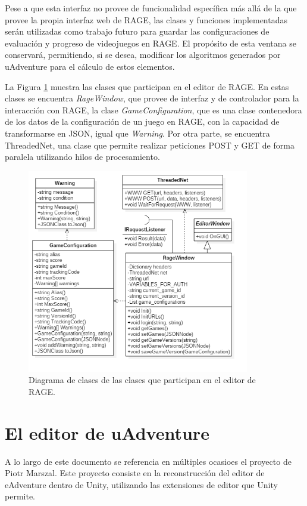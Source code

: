 Pese a que esta interfaz no provee de funcionalidad específica más allá de la que provee la propia interfaz web de RAGE, las clases y funciones implementadas serán utilizadas como trabajo futuro para guardar las configuraciones de evaluación y progreso de videojuegos en RAGE. El propósito de esta ventana se conservará, permitiendo, si se desea, modificar los algoritmos generados por uAdventure para el cálculo de estos elementos.

La Figura \ref{ragewindowit3} muestra las clases que participan en el editor de RAGE. En estas clases se encuentra \textit{RageWindow}, que provee de interfaz y de controlador para la interacción con RAGE, la clase \textit{GameConfiguration}, que es una clase contenedora de los datos de la configuración de un juego en RAGE, con la capacidad de transformarse en JSON, igual que \textit{Warning}. Por otra parte, se encuentra ThreadedNet, una clase que permite realizar peticiones POST y GET de forma paralela utilizando hilos de procesamiento.

\begin{figure}[h!]
	\centerline{\includegraphics[height=3.5in]{figures/it3/RageWindow.png}}
	\caption[Diagrama de Clases - Editor de RAGE]{Diagrama de clases de las clases que participan en el editor de RAGE.}
	\label{ragewindowit3}
\end{figure}

\chapter{El editor de uAdventure}
\label{piotr}

A lo largo de este documento se referencia en múltiples ocasioes el proyecto de Piotr Marszal. Este proyecto consiste en la reconstrucción del editor de eAdventure dentro de Unity, utilizando las extensiones de editor que Unity permite.

